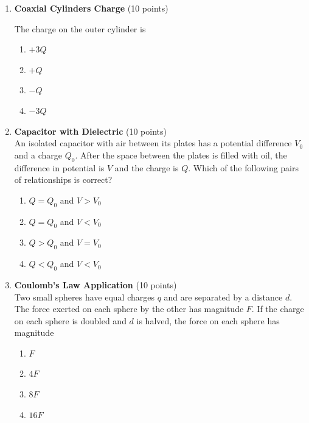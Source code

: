 \begin{enumerate}
  \item \textbf{Coaxial Cylinders Charge} (10 points)\\
  
  The charge on the outer cylinder is
  \begin{enumerate}[label=(\Alph*)]
    \item $+3Q$
    \item $+Q$
    \item $-Q$
    \item $-3Q$
  \end{enumerate}
  \begin{subanswer}
  \end{subanswer}

  \item \textbf{Capacitor with Dielectric} (10 points)\\
  An isolated capacitor with air between its plates has a potential difference $V_0$ and a charge $Q_0$. After the space between the plates is filled with oil, the difference in potential is $V$ and the charge is $Q$. Which of the following pairs of relationships is correct?
  \begin{enumerate}[label=(\Alph*)]
    \item $Q = Q_0$ and $V > V_0$
    \item $Q = Q_0$ and $V < V_0$
    \item $Q > Q_0$ and $V = V_0$
    \item $Q < Q_0$ and $V < V_0$
  \end{enumerate}
  \begin{subanswer}
  \end{subanswer}

  \item \textbf{Coulomb's Law Application} (10 points)\\
  Two small spheres have equal charges $q$ and are separated by a distance $d$. The force exerted on each sphere by the other has magnitude $F$. If the charge on each sphere is doubled and $d$ is halved, the force on each sphere has magnitude
  \begin{enumerate}[label=(\Alph*)]
    \item $F$
    \item $4F$
    \item $8F$
    \item $16F$
  \end{enumerate}
  \begin{subanswer}
  \end{subanswer}


\end{enumerate}
